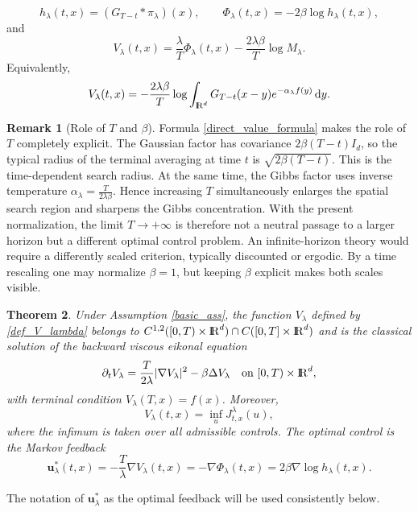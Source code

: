 \documentclass[11pt]{amsart}
\def\R{\mathrm{I\kern-0.21emR}}
\newcommand{\dd}{\,\mathrm{d}}
\renewcommand{\Vert}{|}
\numberwithin{equation}{section}
\numberwithin{figure}{section}
\newtheorem{theorem}{Theorem}[section]
\theoremstyle{definition}\newtheorem{remark}[theorem]{Remark}%
\begin{document}
\begin{equation}\label{def_h_phi}
h_\lambda(t,x) = (G_{T-t} * \pi_\lambda)(x),
\qquad
\Phi_\lambda(t,x) = - 2\beta \log h_\lambda(t,x),
\end{equation}
and
\begin{equation}\label{def_V_lambda}
V_\lambda(t,x) = \frac{\lambda}{T}\Phi_\lambda(t,x) - \frac{2\lambda\beta}{T}\log M_\lambda.
\end{equation}
Equivalently,
\begin{equation}\label{direct_value_formula}
V_\lambda(t,x) = - \frac{2\lambda\beta}{T}\log \int_{\R^d} G_{T-t}(x-y)e^{-\alpha_\lambda f(y)}\dd y.
\end{equation}
\begin{remark}[Role of $T$ and $\beta$]\label{roleT}
Formula \eqref{direct_value_formula} makes the role of $T$ completely explicit. The Gaussian factor has covariance $2\beta(T-t)I_d$, so the typical radius of the terminal averaging at time $t$ is $\sqrt{2\beta(T-t)}$. This is the time-dependent search radius. At the same time, the Gibbs factor uses inverse temperature $\alpha_\lambda = \frac{T}{2\lambda\beta}$. Hence increasing $T$ simultaneously enlarges the spatial search region and sharpens the Gibbs concentration. With the present normalization, the limit $T \to +\infty$ is therefore not a neutral passage to a larger horizon but a different optimal control problem. An infinite-horizon theory would require a differently scaled criterion, typically discounted or ergodic. By a time rescaling one may normalize $\beta = 1$, but keeping $\beta$ explicit makes both scales visible.
\end{remark}

\begin{theorem}\label{main_value}
Under Assumption \ref{basic_ass}, the function $V_\lambda$ defined by \eqref{def_V_lambda} belongs to $C^{1,2}([0,T) \times \R^d) \cap C([0,T] \times \R^d)$ and is the classical solution of the backward viscous eikonal equation
\begin{equation}\label{hjb}
\partial_t V_\lambda = \frac{T}{2\lambda}\Vert \nabla V_\lambda \Vert^2 - \beta \Delta V_\lambda
\quad
\text{on } [0,T) \times \R^d,
\end{equation}
with terminal condition $V_\lambda(T,x) = f(x)$. Moreover,
$$
V_\lambda(t,x) = \inf_u J^\lambda_{t,x}(u),
$$
where the infimum is taken over all admissible controls. The optimal control is the Markov feedback
\begin{equation}\label{optimal_feedback_formula}
\mathbf u_\lambda^*(t,x) = - \frac{T}{\lambda}\nabla V_\lambda(t,x) = - \nabla \Phi_\lambda(t,x) = 2\beta \nabla \log h_\lambda(t,x).
\end{equation}
\end{theorem}
\noindent
The notation of $\mathbf u_\lambda^*$ as the optimal feedback will be used consistently below.
\end{document}
